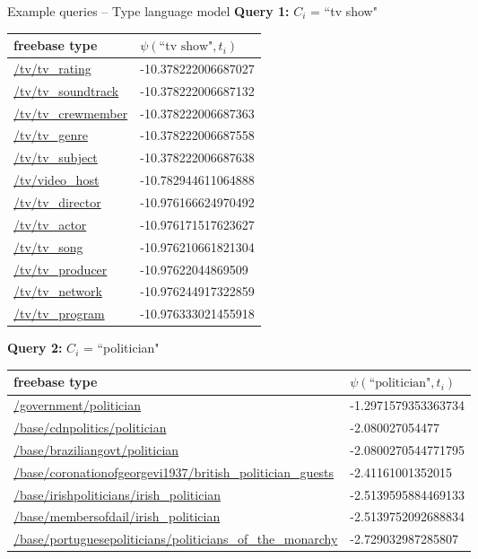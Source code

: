 \documentclass[pdf,11pt]{beamer}
\begin{document}
\begin{frame}{Example queries -- Type language model}
\textbf{Query 1:} $C_i$ = ``tv show"
\begin{longtable}{| p{} | p{} |}
\hline
\textbf{freebase type} & $\psi(\text{``tv show"}, t_i)$ \\ \hline \hline

\url{/tv/tv_rating} & -10.378222006687027 \\ \hline
\url{/tv/tv_soundtrack} & -10.378222006687132 \\ \hline
\url{/tv/tv_crewmember} & -10.378222006687363 \\ \hline
\url{/tv/tv_genre} & -10.378222006687558 \\ \hline
\url{/tv/tv_subject} & -10.378222006687638 \\ \hline
\url{/tv/video_host} & -10.782944611064888 \\ \hline
\url{/tv/tv_director} & -10.976166624970492 \\ \hline
\url{/tv/tv_actor} & -10.976171517623627 \\ \hline
\url{/tv/tv_song} & -10.976210661821304 \\ \hline
\url{/tv/tv_producer} & -10.97622044869509 \\ \hline
\url{/tv/tv_network} & -10.976244917322859 \\ \hline
\url{/tv/tv_program} & -10.976333021455918 \\ \hline

\end{longtable}
\end{frame}

\begin{frame}{}

\textbf{Query 2:} $C_{i}$ = ``politician"

\begin{longtable}{| p{} | p{} |}
\hline
\textbf{freebase type} & $\psi(\text{``politician"}, t_i)$ \\ \hline \hline

\url{/government/politician} & -1.2971579353363734 \\ \hline
\url{/base/cdnpolitics/politician} & -2.080027054477 \\ \hline
\url{/base/braziliangovt/politician} & -2.0800270544771795 \\ \hline
\url{/base/coronationofgeorgevi1937/british_politician_guests} & -2.41161001352015 \\ \hline
\url{/base/irishpoliticians/irish_politician} & -2.5139595884469133 \\ \hline
\url{/base/membersofdail/irish_politician} & -2.5139752092688834 \\ \hline
\url{/base/portuguesepoliticians/politicians_of_the_monarchy} & -2.729032987285807 \\ \hline

\end{longtable}

\end{frame}
\end{document}
